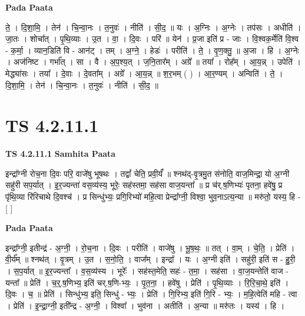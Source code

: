 \documentclass[17pt]{extarticle}
\begin{document}
\textbf{Pada Paata} \newline

ते॒ । दि॒शा॒मि॒ । तेन॑ । चि॒न्वा॒नः । त॒नुवः॑ । नीति॑ । सी॒द॒ ॥ यः । अ॒ग्निः । अ॒ग्नेः । तप॑सः । अधीति॑ । जा॒तः । शोचा᳚त् । पृ॒थि॒व्याः । उ॒त । वा॒ । दि॒वः । परि॑ ॥ येन॑ । प्र॒जा इति॑ प्र - जाः । वि॒श्वक॒र्मेति॑ वि॒श्व - क॒र्मा॒ । व्यान॒डिति॑ वि - आन॑ट् । तम् । अ॒ग्ने॒ । हेडः॑ । परीति॑ । ते॒ । वृ॒ण॒क्तु॒ ॥ अ॒जा । हि । अ॒ग्नेः । अज॑निष्ट । गर्भा᳚त् । सा । वै । अ॒प॒श्य॒त् । ज॒नि॒तार᳚म् । अग्रे᳚ ॥ तया᳚ । रोह᳚म् । आ॒य॒न्न् । उपेति॑ । मेद्ध्या॑सः । तया᳚ । दे॒वाः । दे॒वता᳚म् । अग्रे᳚ । आ॒य॒न्न् ॥ श॒र॒भम् ( ) । आ॒र॒ण्यम् । अन्विति॑ । ते॒ । दि॒शा॒मि॒ । तेन॑ । चि॒न्वा॒नः । त॒नुवः॑ । नीति॑ । सी॒द॒ ॥  \newline





\section{ TS 4.2.11.1 }

\textbf{TS 4.2.11.1 } \newline
\textbf{Samhita Paata} \newline

इन्द्रा᳚ग्नी रोच॒ना दि॒वः परि॒ वाजे॑षु भूषथः । तद्वां᳚ चेति॒ प्रवी॒र्यं᳚ ॥ श्नथ॑द्-वृ॒त्रमु॒त स॑नोति॒ वाज॒मिन्द्रा॒ यो अ॒ग्नी सहु॑री सप॒र्यात् । इ॒र॒ज्यन्ता॑ वस॒व्य॑स्य॒ भूरेः॒ सह॑स्तमा॒ सह॑सा वाज॒यन्ता᳚ ॥ प्र च॑र्.ष॒णिभ्यः॑ पृतना॒ हवे॑षु॒ प्र पृ॑थि॒व्या रि॑रिचाथे दि॒वश्च॑ । प्र सिन्धु॑भ्यः॒ प्रगि॒रिभ्यो॑ महि॒त्वा प्रेन्द्रा᳚ग्नी॒ विश्वा॒ भुव॒नाऽत्य॒न्या ॥ मरु॑तो॒ यस्य॒ हि - [  ] \newline

\textbf{Pada Paata} \newline

इन्द्रा᳚ग्नी॒ इतीन्द्र॑ - अ॒ग्नी॒ । रो॒च॒ना । दि॒वः । परीति॑ । वाजे॑षु । भू॒ष॒थः॒ ॥ तत् । वा॒म् । चे॒ति॒ । प्रेति॑ । वी॒र्य᳚म् ॥ श्नथ॑त् । वृ॒त्रम् । उ॒त । स॒नो॒ति॒ । वाज᳚म् । इन्द्रा᳚ । यः । अ॒ग्नी इति॑ । सहु॑री॒ इति॑ स - हु॒री॒ । स॒प॒र्यात् ॥ इ॒र॒ज्यन्ता᳚ । व॒स॒व्य॑स्य । भूरेः᳚ । सह॑स्त॒मेति॒ सहः॑ - त॒मा॒ । सह॑सा । वा॒ज॒यन्तेति॑ वाज - यन्ता᳚ ॥ प्रेति॑ । च॒र्॒.ष॒णिभ्य॒ इति॑ चर्.ष॒णि-भ्यः॒ । पृ॒त॒ना॒ । हवे॑षु । प्रेति॑ । पृ॒थि॒व्याः । रि॒रि॒चा॒थे॒ इति॑ । दि॒वः । च॒ ॥ प्रेति॑ । सिन्धु॑भ्य॒ इति॒ सिन्धु॑ - भ्यः॒ । प्रेति॑ । गि॒रिभ्य॒ इति॑ गि॒रि - भ्यः॒ । म॒हि॒त्वेति॑ महि - त्वा । प्रेति॑ । इ॒न्द्रा॒ग्नी॒ इती᳚न्द्र - अ॒ग्नी॒ । विश्वा᳚ । भुव॑ना । अतीति॑ । अ॒न्या ॥ मरु॑तः । यस्य॑ । हि ।  \newline
\end{document}
